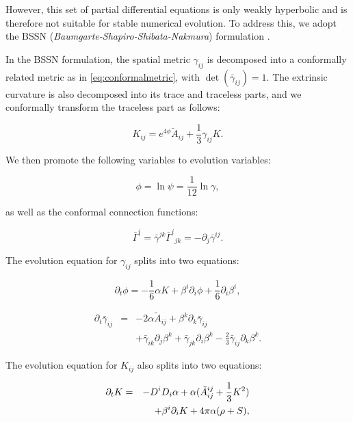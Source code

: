 \documentclass[]{article}
\begin{document}
However, this set of partial differential equations is only weakly hyperbolic and is therefore not suitable for stable numerical evolution. To address this, we adopt the BSSN (\textit{Baumgarte-Shapiro-Shibata-Nakmura}) formulation \cite{Nakamura:1987,  Shibata:1995we, Baumgarte:1998te}.

In the BSSN formulation, the spatial metric $\gamma_{ij}$ is decomposed into a conformally related metric as in \eqref{eq:conformalmetric}, with $\det (\bar{\gamma}_{ij}) = 1$. The extrinsic curvature is also decomposed into its trace and traceless parts, and we conformally transform the traceless part as follows:

\begin{equation}
	K_{ij} = e^{4\phi}\tilde{A}_{ij} + \frac{1}{3}\gamma_{ij}K.
\end{equation}

We then promote the following variables to evolution variables:

\begin{equation}
	\phi = \ln \psi = \frac{1}{12}\ln \gamma,
\end{equation}

as well as the conformal connection functions:

\begin{equation}
	\bar{\Gamma}^i = \bar{\gamma}^{jk}\bar{\Gamma}^i{}_{jk} = -\partial_j \bar{\gamma}^{ij}.
\end{equation}

The evolution equation for $\gamma_{ij}$ splits into two equations:

\begin{equation}
	\partial_t \phi = - \frac{1}{6}\alpha K + \beta^i \partial_i \phi + \frac{1}{6}\partial_i \beta^i,
\end{equation}

\begin{eqnarray}
	\label{eq:bssn_gamma}
	\partial_t \bar{\gamma}_{ij} &=& -2\alpha \tilde{A}_{ij} + \beta^k \partial_k \bar{\gamma}_{ij}  \nonumber\\&&+\bar{\gamma}_{ik}\partial_j \beta^k + \bar{\gamma}_{jk}\partial_i \beta^k - \frac{2}{3}\bar{\gamma}_{ij}\partial_k\beta^k.
\end{eqnarray}

The evolution equation for $K_{ij}$ also splits into two equations:

\begin{eqnarray}
	\label{eq:bssn_K}
	\partial_t K &=& -D^iD_i \alpha + \alpha (\tilde{A}_{ij}\title{A}^{ij} + \frac{1}{3}K^2)\nonumber\\&&+\beta^i\partial_i K + 4\pi \alpha (\rho + S),
\end{eqnarray}
\end{document}
